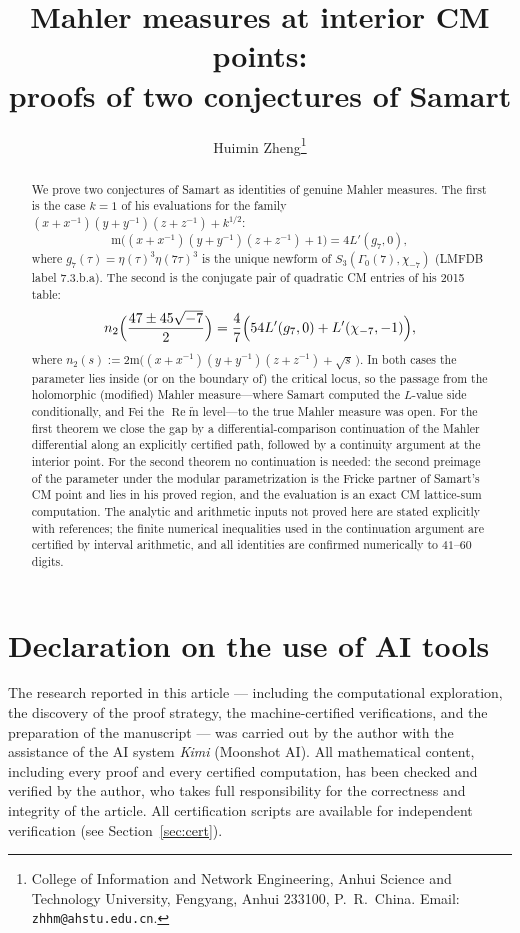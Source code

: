 \documentclass[11pt]{article}
\title{Mahler measures at interior CM points:\\
proofs of two conjectures of Samart}
\author{Huimin Zheng\thanks{%
College of Information and Network Engineering,
Anhui Science and Technology University,
Fengyang, Anhui 233100, P.~R.~China.
Email: \texttt{zhhm@ahstu.edu.cn}.}}
\date{}
\theoremstyle{definition}
\theoremstyle{remark}
\newcommand{\ReT}{\operatorname{Re}}
\newcommand{\m}{\mathrm{m}}
\newcommand{\mt}{\widetilde{\m}}
\begin{document}
\maketitle

\section*{Declaration on the use of AI tools}
The research reported in this article — including the computational
exploration, the discovery of the proof strategy, the machine-certified
verifications, and the preparation of the manuscript — was carried out by
the author with the assistance of the AI system \emph{Kimi} (Moonshot AI).
All mathematical content, including every proof and every certified
computation, has been checked and verified by the author, who takes full
responsibility for the correctness and integrity of the article. All
certification scripts are available for independent verification
(see Section~\ref{sec:cert}).

\begin{abstract}
We prove two conjectures of Samart as identities of genuine Mahler
measures. The first is the case $k=1$ of his evaluations for the family
$(x+x^{-1})(y+y^{-1})(z+z^{-1})+k^{1/2}$:
\[
  \m\bigl((x+x^{-1})(y+y^{-1})(z+z^{-1})+1\bigr)=4L'(g_7,0),
\]
where $g_7(\tau)=\eta(\tau)^3\eta(7\tau)^3$ is the unique newform of
$S_3(\Gamma_0(7),\chi_{-7})$ (LMFDB label \textsf{7.3.b.a}). The second is
the conjugate pair of quadratic CM entries of his 2015 table:
\[
  n_2\Bigl(\frac{47\pm45\sqrt{-7}}2\Bigr)
  =\frac47\Bigl(54L'(g_7,0)+L'(\chi_{-7},-1)\Bigr),
\]
where $n_2(s):=2\m\bigl((x+x^{-1})(y+y^{-1})(z+z^{-1})+\sqrt{s}\,\bigr)$.
In both cases the parameter lies inside (or on the boundary of) the
critical locus, so the passage from the holomorphic (modified) Mahler
measure---where Samart computed the $L$-value side conditionally, and
Fei the $\ReT\mt$ level---to the true Mahler measure was open. For the
first theorem we close the gap by a differential-comparison continuation
of the Mahler differential along an explicitly certified path, followed
by a continuity argument at the interior point. For the second theorem
no continuation is needed: the second preimage of the parameter under
the modular parametrization is the Fricke partner of Samart's CM point
and lies in his proved region, and the evaluation is an exact CM
lattice-sum computation. The analytic and arithmetic inputs not proved
here are stated explicitly with references; the finite numerical
inequalities used in the continuation argument are certified by interval
arithmetic, and all identities are confirmed numerically to
$41$--$60$ digits.
\end{abstract}
\end{document}
